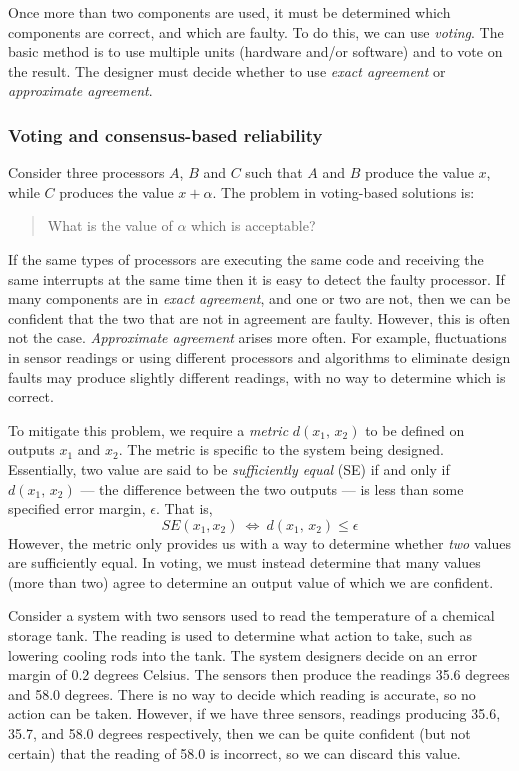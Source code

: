 Once more than two components are used, it must be determined which components are correct, and which are faulty. To do this, we can use {\em voting}. The basic method is to use multiple units (hardware and/or software) and to vote on the result.  The designer must decide whether to use \emph{exact agreement} or \emph{approximate agreement}.


\subsubsection*{Voting and consensus-based reliability}

Consider three processors \(A\), \(B\) and \(C\) such that \(A\) and \(B\) produce the value \(x\), while \(C\) produces the value \(x + \alpha\). The problem in voting-based solutions is:

\begin{quote}
 What is the value of \(\alpha\) which is acceptable?
 \end{quote}

If the same types of processors are executing the same code and receiving the same interrupts at the same time then it is easy to detect the faulty processor. If many components are in \emph{exact agreement}, and one or two are not, then we can be confident that the two that are not in agreement are faulty. However, this is often not the case.  \emph{Approximate agreement} arises more often. For example, fluctuations in sensor readings or using different processors and algorithms to eliminate design faults may produce slightly different readings, with no way to determine which is correct.

To mitigate this problem, we require a \emph{metric} \(d(x_1,\,x_2)\) to be defined on outputs \(x_1\) and \(x_2\). The metric is specific to the system being designed. Essentially, two value are said to be \emph{sufficiently equal} (SE) if and only if \(d(x_1,\,x_2)\) --- the difference between the two outputs --- is less than some specified error margin, $\epsilon$. That is,
\[ SE(x_1, x_2)~ \iff  ~ d(x_1,\,x_2) \leq \epsilon\]
However, the metric only provides us with a way to determine whether \emph{two} values are sufficiently equal. In voting, we must instead determine that many values (more than two) agree to determine an output value of which we are confident.

\begin{example}
Consider a system with two sensors used to read the temperature of a chemical storage tank. The reading is used to determine what action to take, such as lowering cooling rods into the tank. The system designers decide on an error margin of 0.2 degrees Celsius. The sensors then produce the readings 35.6 degrees and 58.0 degrees. There is no way to decide which reading is accurate, so no action can be taken. However, if we have three sensors, readings producing 35.6, 35.7, and 58.0 degrees respectively, then we can be quite confident (but not certain) that the reading of 58.0 is incorrect, so we can discard this value.

\end{example}

